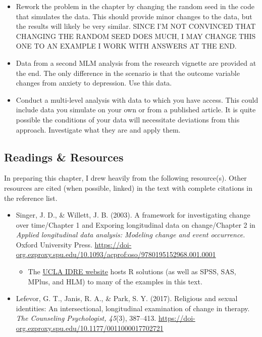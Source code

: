 \documentclass[
  english,
]{book}
\providecommand{\tightlist}{%
  \setlength{\itemsep}{0pt}\setlength{\parskip}{0pt}}
\begin{document}
\begin{itemize}
\tightlist
\item
  Rework the problem in the chapter by changing the random seed in the code that simulates the data. This should provide minor changes to the data, but the results will likely be very similar. SINCE I'M NOT CONVINCED THAT CHANGING THE RANDOM SEED DOES MUCH, I MAY CHANGE THIS ONE TO AN EXAMPLE I WORK WITH ANSWERS AT THE END.
\item
  Data from a second MLM analysis from the research vignette are provided at the end. The only difference in the scenario is that the outcome variable changes from anxiety to depression. Use this data.
\item
  Conduct a multi-level analysis with data to which you have access. This could include data you simulate on your own or from a published article. It is quite possible the conditions of your data will necessitate deviations from this approach. Investigate what they are and apply them.
\end{itemize}

\hypertarget{readings-resources-1}{%
\subsection{Readings \& Resources}\label{readings-resources-1}}

In preparing this chapter, I drew heavily from the following resource(s). Other resources are cited (when possible, linked) in the text with complete citations in the reference list.

\begin{itemize}
\tightlist
\item
  Singer, J. D., \& Willett, J. B. (2003). A framework for investigating change over time/Chapter 1 and Exporing longitudinal data on change/Chapter 2 in \emph{Applied longitudinal data analysis: Modeling change and event occurrence.} Oxford University Press. \url{https://doi-org.ezproxy.spu.edu/10.1093/acprof:oso/9780195152968.001.0001}

  \begin{itemize}
  \tightlist
  \item
    The \href{https://stats.idre.ucla.edu/other/examples/alda/}{UCLA IDRE website} hosts R solutions (as well as SPSS, SAS, MPlus, and HLM) to many of the examples in this text.
  \end{itemize}
\item
  Lefevor, G. T., Janis, R. A., \& Park, S. Y. (2017). Religious and sexual identities: An intersectional, longitudinal examination of change in therapy. \emph{The Counseling Psychologist, 45}(3), 387--413. \url{https://doi-org.ezproxy.spu.edu/10.1177/0011000017702721}
\end{itemize}
\end{document}
